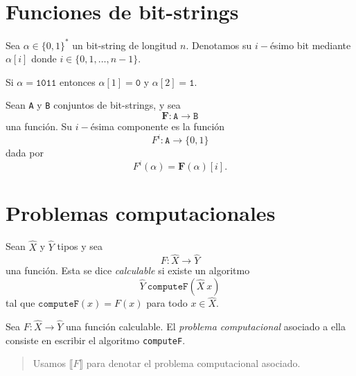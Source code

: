 


\maketitle
\section{Funciones de bit-strings}
\begin{dfn}
	Sea 
	\(
		\alpha \in \{0, 1\}^* 
	\)
	un bit-string de longitud $n$. Denotamos su
	$i-$ésimo bit mediante
	\(
		\alpha[i]
	\)
	donde
	\(
		i \in
		\{
			0, 1, \ldots, n-1
		\}
	\).
\end{dfn}

\begin{exl}
	Si
	\(
		\alpha= \texttt{1011}
	\)
	entonces
	\(
		\alpha[1] = \texttt{0}
	\)
	y
	\(
		\alpha[2] = \texttt{1}
	\).
\end{exl}

\begin{dfn}
	Sean \texttt{A} y \texttt{B} conjuntos de bit-strings, y sea
	\[
		\mathbf{F} : \texttt{A} \to \texttt{B}
	\]
	una función. Su $i-$ésima componente es la función
	\[
		F^i : \texttt{A} \to \{0, 1\}
	\]
	dada por
	\[
		F^i(\alpha)= \mathbf{F}(\alpha)[i].
	\]
\end{dfn}


\section{Problemas computacionales}

\begin{dfn}
	Sean $\hat{X}$ y $\hat{Y}$ tipos y sea
	\[
		F : \hat{X} \to \hat{Y}
	\]
	una función. Esta se dice \emph{calculable} si existe un algoritmo
	\[
		\hat{Y}\ \texttt{computeF}(\hat{X}\ x)
	\]
	tal que
	\(
		\texttt{computeF}(x) = F(x)
	\)
	para todo $x \in \hat{X}$.
\end{dfn}

\begin{dfn}
	Sea
	\(
		F : \hat{X} \to \hat{Y}
	\)
	una función calculable. El \emph{problema computacional} asociado a ella
	consiste en escribir el algoritmo \texttt{computeF}.

	\medskip
	\begin{quote}
		 Usamos
			\(
				\llbracket
					F
				\rrbracket
			\)
		para denotar el problema computacional asociado.
	\end{quote}
\end{dfn}

